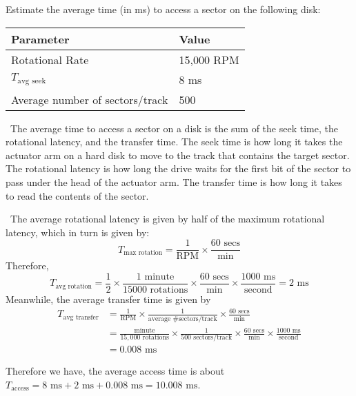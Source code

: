 \documentclass[12pt]{article}
\newenvironment{ex}[2][Exercise]{\begin{trivlist}
		\item[\hskip \labelsep {\bfseries #1}\hskip \labelsep {\bfseries #2.}]}{\end{trivlist}}
\newenvironment{sol}[1][Solution]{\begin{trivlist}
		\item[\hskip \labelsep {\bfseries #1:}]}{\end{trivlist}}
\begin{document}
\begin{ex}{6.3}
	Estimate the average time (in ms) to access a sector on the following disk:
	\begin{center}
		\begin{tabular}{ll}
			Parameter & Value\\
			\hline
			Rotational Rate & 15,000 RPM\\
			$T_{\text{avg seek}}$ & 8 ms\\
			Average number of sectors/track & 500
		\end{tabular}
	\end{center}
\end{ex}

\begin{sol}
	\
	The average time to access a sector on a disk is the sum of the seek time, the rotational
	latency, and the transfer time. The seek time is how long it takes the actuator arm on
	a hard disk to move to the track that contains the target sector. The rotational latency
	is how long the drive waits for the first bit of the sector to pass under the head of
	the actuator arm. The transfer time is how long it takes to read the contents of the sector.
	
	\
	The average rotational latency is given by half of the maximum rotational latency,
	which in turn is given by:
	\[
	T_{\text{max rotation}}=\frac{1}{\text{RPM}}\times \frac{60 \text{ secs}}{\text{min}}
	\]
	Therefore,
	\[
	T_{\text{avg rotation}}=\frac{1}{2}\times \frac{1 \text{ minute}}{15000 \text{ rotations}}
	\times \frac{60 \text{ secs}}{\text{min}}
	\times \frac{1000 \text{ ms}}{\text{second}}
	=2\text{ ms}
	\]
	Meanwhile, the average transfer time is given by
	\begin{align*}
	T_{\text{avg transfer}}
	&=\frac{1}{\text{RPM}}\times \frac{1}{\text{average \# sectors/track}}
	\times \frac{60\text{ secs}}{\text{min}}\\
	&=\frac{\text{minute}}{15,000 \text{ rotations}}
	\times \frac{1}{500 \text{ sectors/track}}
	\times \frac{60 \text{ secs}}{\text{min}}
	\times \frac{1000 \text{ ms}}{\text{second}}\\
	&=0.008\text{ ms}
	\end{align*}

	Therefore we have, the average access time is about
	$T_{\text{access}}=8\text{ ms}+2\text{ ms}+0.008\text{ ms}=10.008\text{ ms}$.
\end{sol}
\end{document}
